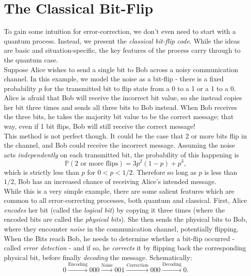 \documentclass[12pt,a4paper]{report}
\numberwithin{equation}{section}
\theoremstyle{definition}
\theoremstyle{theorem}
\theoremstyle{theorem}
\theoremstyle{example}
\theoremstyle{definition}
\begin{document}
\section{The Classical Bit-Flip}
To gain some intuition for error-correction, we don't even need to start with a quantum process. Instead, we present the \textit{classical bit-flip code}. While the ideas are basic and situation-specific, the key features of the process carry through to the quantum case.\\
Suppose Alice wishes to send a single bit to Bob across a noisy communication channel. In this example, we model the noise as a bit-flip - there is a fixed probability $p$ for the transmitted bit to flip state from a 0 to a 1 or a 1 to a 0. Alice is afraid that Bob will receive the incorrect bit value, so she instead copies her bit three times and sends all three bits to Bob instead. When Bob receives the three bits, he takes the majority bit value to be the correct message; that way, even if 1 bit flips, Bob will still receive the correct message!\\
This method is not perfect though. It could be the case that 2 or more bits flip in the channel, and Bob could receive the incorrect message. Assuming the noise acts \textit{independently} on each transmitted bit, the probability of this happening is
\begin{equation}
	\mathbb{P}(\text{2 or more flips})=3p^{2}(1-p)+p^{3},
\end{equation}
which is strictly less than $p$ for $0<p<1/2$. Therefore so long as $p$ is less than $1/2$, Bob has an increased chance of receiving Alice's intended message.\\
While this is a very simple example, there are some salient features which are common to all error-correcting processes, both quantum and classical. First, Alice \textit{encodes} her bit (called the \textit{logical bit}) by copying it three times (where the encoded bits are called the \textit{physical bits}). She then sends the physical bits to Bob, where they encounter \textit{noise} in the communication channel, potentially flipping. When the Bits reach Bob, he needs to determine whether a bit-flip occurred - called \textit{error detection} - and if so, he \textit{corrects} it by flipping back the corresponding physical bit, before finally \textit{decoding} the message. Schematically:
\begin{equation*}
	0\xrightarrow{\text{Encoding}}000\xrightarrow{\text{Noise}}001\xrightarrow{\text{Correction}}000\xrightarrow{\text{Decoding}}0.
\end{equation*}
\end{document}
